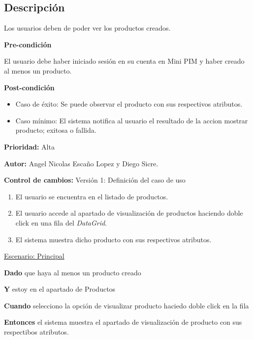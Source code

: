 {}

\subsection*{Descripción}
Los usuarios deben de poder ver los productos creados.\par
\vspace{0.15cm}

\textbf{Pre-condición}\par
El usuario debe haber iniciado sesión en su cuenta en Mini PIM y haber creado al menos un producto.\par
\vspace{0.15cm}

\textbf{Post-condición}
\begin{itemize}
    \item Caso de éxito: Se puede observar el producto con sus respectivos atributos.
    \item Caso mínimo: El sistema notifica al usuario el resultado de la accion mostrar producto; exitosa o fallida.
\end{itemize}

\textbf{Prioridad: }
Alta
\vspace{0.15cm}

\textbf{Autor: }
Angel Nicolas Escaño Lopez y Diego Sicre.\par
\vspace{0.15cm}

\textbf{Control de cambios: } Versión 1: Definición del caso de uso

\begin{enumerate}
    \item El usuario se encuentra en el listado de productos.
    \item El usuario accede al apartado de visualización de productos haciendo doble click en una fila del \textit{DataGrid}.
    \item El sistema muestra dicho producto con sus respectivos atributos.
\end{enumerate}

\underline{Escenario: Principal}\par
\vspace{0.15cm}
\textbf{Dado} que haya al menos un producto creado\par
\textbf{Y} estoy en el apartado de Productos\par
\textbf{Cuando} selecciono la opción de visualizar producto haciedo doble click en la fila\par
\textbf{Entonces} el sistema muestra el apartado de visualización de producto con sus respectibos atributos.\par
\vspace{0.20cm}

